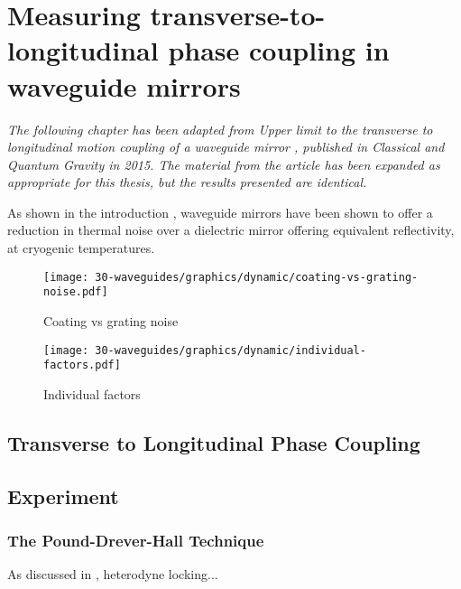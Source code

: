 \chapter{Measuring transverse-to-longitudinal phase coupling in waveguide mirrors}
\label{c:waveguides}

\emph{The following chapter has been adapted from \emph{Upper limit to the transverse to longitudinal motion coupling of a waveguide mirror \cite{Leavey2015}}, published in Classical and Quantum Gravity in 2015. The material from the article has been expanded as appropriate for this thesis, but the results presented are identical.}

As shown in the introduction , waveguide mirrors have been shown to offer a reduction in thermal noise over a dielectric mirror offering equivalent reflectivity, at cryogenic temperatures.


\begin{figure}
  \begin{center}
    \texttt{[image: 30-waveguides/graphics/dynamic/coating-vs-grating-noise.pdf]}
    \caption{Coating vs grating noise}
    \label{fig:coating-vs-grating-noise}
  \end{center}
\end{figure}

\begin{figure}
  \begin{center}
    \texttt{[image: 30-waveguides/graphics/dynamic/individual-factors.pdf]}
    \caption{Individual factors}
    \label{fig:individual-factors}
  \end{center}
\end{figure}

\section{Transverse to Longitudinal Phase Coupling}

\section{Experiment}
\subsection{The Pound-Drever-Hall Technique}
As discussed in , heterodyne locking...

